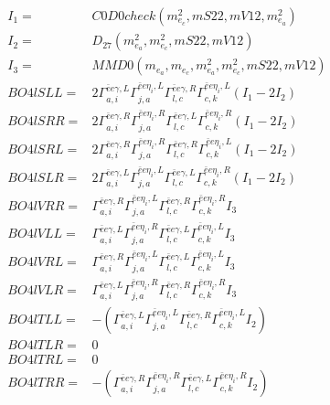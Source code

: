 \documentclass[A4,landscape]{article}
\begin{document}
\begin{align} 
I_1 = & C0D0check(m^2_{e_{{c}}}, mS22, mV12, m^2_{e_{{a}}}) \\ 
I_2 = & D_{27}(m^2_{e_{{a}}}, m^2_{e_{{c}}}, mS22, mV12) \\ 
I_3 = & MMD0(m_{e_{{a}}}, m_{e_{{c}}}, m^2_{e_{{a}}}, m^2_{e_{{c}}}, mS22, mV12) \\ 
  BO4lSLL= & 2  \Gamma^{\bar{e}e \gamma ,L}_{a, i} \Gamma^{\bar{e}e \eta_i ,L}_{j, a} \Gamma^{\bar{e}e \gamma ,R}_{l, c} \Gamma^{\bar{e}e \eta_i ,L}_{c, k} (I_1 - 2 I_2) \\ 
  BO4lSRR= & 2  \Gamma^{\bar{e}e \gamma ,R}_{a, i} \Gamma^{\bar{e}e \eta_i ,R}_{j, a} \Gamma^{\bar{e}e \gamma ,L}_{l, c} \Gamma^{\bar{e}e \eta_i ,R}_{c, k} (I_1 - 2 I_2) \\ 
  BO4lSRL= & 2  \Gamma^{\bar{e}e \gamma ,R}_{a, i} \Gamma^{\bar{e}e \eta_i ,R}_{j, a} \Gamma^{\bar{e}e \gamma ,R}_{l, c} \Gamma^{\bar{e}e \eta_i ,L}_{c, k} (I_1 - 2 I_2) \\ 
  BO4lSLR= & 2  \Gamma^{\bar{e}e \gamma ,L}_{a, i} \Gamma^{\bar{e}e \eta_i ,L}_{j, a} \Gamma^{\bar{e}e \gamma ,L}_{l, c} \Gamma^{\bar{e}e \eta_i ,R}_{c, k} (I_1 - 2 I_2) \\ 
  BO4lVRR= &  \Gamma^{\bar{e}e \gamma ,R}_{a, i} \Gamma^{\bar{e}e \eta_i ,L}_{j, a} \Gamma^{\bar{e}e \gamma ,R}_{l, c} \Gamma^{\bar{e}e \eta_i ,R}_{c, k} I_3 \\ 
  BO4lVLL= &  \Gamma^{\bar{e}e \gamma ,L}_{a, i} \Gamma^{\bar{e}e \eta_i ,R}_{j, a} \Gamma^{\bar{e}e \gamma ,L}_{l, c} \Gamma^{\bar{e}e \eta_i ,L}_{c, k} I_3 \\ 
  BO4lVRL= &  \Gamma^{\bar{e}e \gamma ,R}_{a, i} \Gamma^{\bar{e}e \eta_i ,L}_{j, a} \Gamma^{\bar{e}e \gamma ,L}_{l, c} \Gamma^{\bar{e}e \eta_i ,L}_{c, k} I_3 \\ 
  BO4lVLR= &  \Gamma^{\bar{e}e \gamma ,L}_{a, i} \Gamma^{\bar{e}e \eta_i ,R}_{j, a} \Gamma^{\bar{e}e \gamma ,R}_{l, c} \Gamma^{\bar{e}e \eta_i ,R}_{c, k} I_3 \\ 
  BO4lTLL= & -( \Gamma^{\bar{e}e \gamma ,L}_{a, i} \Gamma^{\bar{e}e \eta_i ,L}_{j, a} \Gamma^{\bar{e}e \gamma ,R}_{l, c} \Gamma^{\bar{e}e \eta_i ,L}_{c, k} I_2) \\ 
  BO4lTLR= & 0 \\ 
  BO4lTRL= & 0 \\ 
  BO4lTRR= & -( \Gamma^{\bar{e}e \gamma ,R}_{a, i} \Gamma^{\bar{e}e \eta_i ,R}_{j, a} \Gamma^{\bar{e}e \gamma ,L}_{l, c} \Gamma^{\bar{e}e \eta_i ,R}_{c, k} I_2) \\ 
\end{align} 
\end{document}
